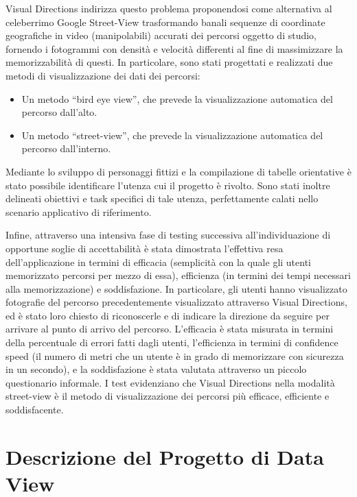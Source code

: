 \documentclass[12pt,a4paper,openright, notitlepage]{report}
\begin{document}
Visual Directions indirizza questo problema proponendosi come alternativa al celeberrimo Google Street-View trasformando banali sequenze di coordinate geografiche in video (manipolabili) accurati dei percorsi oggetto di studio, fornendo i fotogrammi con densità e velocità differenti al fine di massimizzare la memorizzabilità di questi. In particolare, sono stati progettati e realizzati due metodi di visualizzazione dei dati dei percorsi:

\begin{itemize}
\item Un metodo “bird eye view”, che prevede la visualizzazione automatica del percorso dall’alto.
\item Un metodo “street-view”, che prevede la visualizzazione automatica del percorso dall’interno.
\end{itemize}

Mediante lo sviluppo di personaggi fittizi e la compilazione di tabelle orientative è stato possibile identificare l’utenza cui il progetto è rivolto. Sono stati inoltre delineati obiettivi e task specifici di tale utenza, perfettamente calati nello scenario applicativo di riferimento.

Infine, attraverso una intensiva fase di testing successiva all’individuazione di opportune soglie di accettabilità è stata dimostrata l’effettiva resa dell’applicazione in termini di efficacia (semplicità con la quale gli utenti memorizzato percorsi per mezzo di essa), efficienza (in termini dei tempi necessari alla memorizzazione) e soddisfazione. In particolare, gli utenti hanno visualizzato fotografie del percorso precedentemente visualizzato attraverso Visual Directions, ed è stato loro chiesto di riconoscerle e di indicare la direzione da seguire per arrivare al punto di arrivo del percorso. L’efficacia è stata misurata in termini della percentuale di errori fatti dagli utenti, l’efficienza in termini di confidence speed (il numero di metri che un utente è in grado di memorizzare con sicurezza in un secondo), e la soddisfazione è stata valutata attraverso un piccolo questionario informale. I test evidenziano che Visual Directions nella modalità street-view è il metodo di visualizzazione dei percorsi più efficace, efficiente e soddisfacente.


\chapter{Descrizione del Progetto di Data View}
\end{document}
